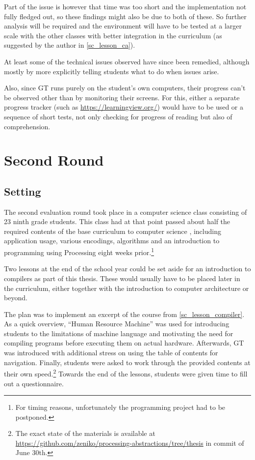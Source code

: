 Part of the issue is however that time was too short and the implementation not fully fledged out, so these findings might also be due to both of these. So further analysis will be required and the environment will have to be tested at a larger scale with the other classes with better integration in the curriculum (as suggested by the author in \ref{sc_lesson_ca}).

At least some of the technical issues observed have since been remedied, although mostly by more explicitly telling students what to do when issues arise.

Also, since \ac{GT} runs purely on the student's own computers, their progress can't be observed other than by monitoring their screens. For this, either a separate progress tracker (such as \url{https://learningview.org/}) would have to be used or a sequence of short tests, not only checking for progress of reading but also of comprehension.



\section{Second Round} \label{sc_validation_compiler} %

\subsection{Setting}

The second evaluation round took place in a computer science class consisting of 23 ninth grade students. This class had at that point passed about half the required contents of the base curriculum to computer science \cite[p.\,145--146]{Erz16}, including application usage, various encodings, algorithms and an introduction to programming using Processing eight weeks prior.\footnote{For timing reasons, unfortunately the programming project had to be postponed.}

Two lessons at the end of the school year could be set aside for an introduction to compilers as part of this thesis. These would usually have to be placed later in the curriculum, either together with the introduction to computer architecture or beyond.

The plan was to implement an excerpt of the course from \ref{sc_lesson_compiler}. As a quick overview, ``Human Resource Machine'' was used for introducing students to the limitations of machine language and motivating the need for compiling programs before executing them on actual hardware. Afterwards, \ac{GT} was introduced with additional stress on using the table of contents for navigation. Finally, students were asked to work through the provided contents at their own speed.\footnote{The exact state of the materials is available at \url{https://github.com/zeniko/processing-abstractions/tree/thesis} in commit  of June 30th.} Towards the end of the lessons, students were given time to fill out a questionnaire.

